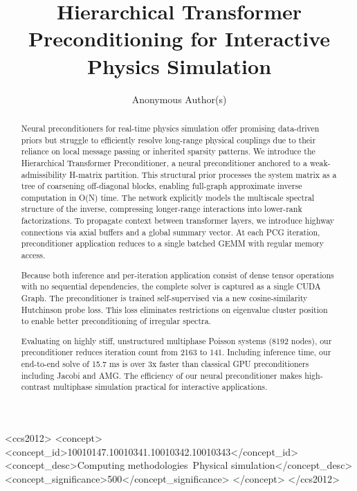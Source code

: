 \documentclass[acmtog,anonymous,review]{acmart}
\begin{document}
\title{Hierarchical Transformer Preconditioning for Interactive Physics Simulation}

\author{Anonymous Author(s)}

\renewcommand{\shortauthors}{Anonymous Author(s)}

\begin{abstract}
Neural preconditioners for real-time physics simulation offer promising data-driven priors but struggle to efficiently resolve long-range physical couplings due to their reliance on local message passing or inherited sparsity patterns. We introduce the Hierarchical Transformer Preconditioner, a neural preconditioner anchored to a weak-admissibility H-matrix partition. This structural prior processes the system matrix as a tree of coarsening off-diagonal blocks, enabling full-graph approximate inverse computation in O(N) time. The network explicitly models the multiscale spectral structure of the inverse, compressing longer-range interactions into lower-rank factorizations. To propagate context between transformer layers, we introduce highway connections via axial buffers and a global summary vector. At each PCG iteration, preconditioner application reduces to a single batched GEMM with regular memory access.

Because both inference and per-iteration application consist of dense tensor operations with no sequential dependencies, the complete solver is captured as a single CUDA Graph. The preconditioner is trained self-supervised via a new cosine-similarity Hutchinson probe loss. This loss eliminates restrictions on eigenvalue cluster position to enable better preconditioning of irregular spectra. 

Evaluating on highly stiff, unstructured multiphase Poisson systems (8192 nodes), our preconditioner reduces iteration count from 2163 to 141. Including inference time, our end-to-end solve of 15.7 ms is over 3x faster than classical GPU preconditioners including Jacobi and AMG. The efficiency of our neural preconditioner makes high-contrast multiphase simulation practical for interactive applications.    
\end{abstract}

\begin{CCSXML}
<ccs2012>
 <concept>
  <concept_id>10010147.10010341.10010342.10010343</concept_id>
  <concept_desc>Computing methodologies~Physical simulation</concept_desc>
  <concept_significance>500</concept_significance>
 </concept>
</ccs2012>
\end{CCSXML}
\end{document}
